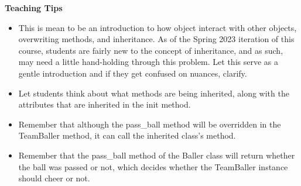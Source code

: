 \begin{blocksection}
\begin{guide}
\begin{blocksection}
\textbf{Teaching Tips}
    \begin{itemize}
    \item This is mean to be an introduction to how object interact with other objects, overwriting methods, and inheritance. As of the Spring 2023 iteration of this course, students are fairly new to the concept of inheritance, and as such, may need a little hand-holding through this problem. Let this serve as a gentle introduction and if they get confused on nuances, clarify.
    \item Let students think about what methods are being inherited, along with the attributes that are inherited in the init method.
    \item Remember that although the pass\_ball method will be overridden in the TeamBaller method, it can call the inherited class's method.
    \item Remember that the pass\_ball method of the Baller class will return whether the ball was passed or not, which decides whether the TeamBaller instance should cheer or not.
    \end{itemize}
\end{blocksection}
\end{guide}

\end{blocksection}